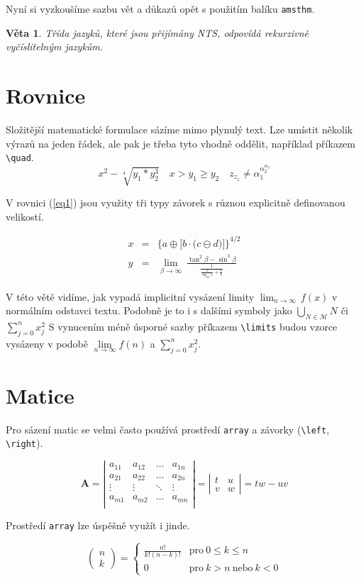 \documentclass[twocolumn,a4paper,11pt,draft]{article}
\newtheorem{theorem}{Věta}
\theoremstyle{definition}
\begin{document}
	Nyní si vyzkoušíme sazbu vět a důkazů opět s použitím balíku \verb!amsthm!.
	
	\begin{theorem}
	Třída jazyků, které jsou přijímány NTS, odpovídá \textnormal{rekurzivně vyčíslitelným jazykům.}
	\end{theorem}
	
	\section{Rovnice}
	Složitější matematické formulace sázíme mimo plynulý text. Lze umístit několik výrazů na jeden řádek, ale pak je třeba tyto vhodně oddělit, například příkazem \verb!\quad!.
	$$x^2-\sqrt[4]{y_1*y_{2}^{3}}\quad x > y_1 \ge y_2\quad z_{z_{z}} \neq \alpha_{1}^{\alpha_{2}^{\alpha_3}}$$
	
	V rovnici (\ref{eq1}) jsou využity tři typy závorek s různou explicitně definovanou velikostí.
	
	\begin{eqnarray}
		\label{eq1}
		x & = &\bigg\{ a \oplus \Big[ b \cdot \big(c \ominus d\big) \Big] \bigg\}^{4/2}\\
		\label{eq2}
		y & = &\underset{\beta \to \infty}{\lim} \ \frac{\tan^2\beta - \sin^3\beta}{\frac{1}{\frac{1}{\log_{42}x}+\frac{1}{2}}}
	\end{eqnarray}
	
	V této větě vidíme, jak vypadá implicitní vysázení limity $\lim_{n \to \infty}\,f(x)$ v normálním odstavci textu. Podobně je to i s dalšími symboly jako $\bigcup_{N \in \mathcal{M}}N$ či $\sum^{n}_{j=0}x^{2}_j$
	S vynucením méně úsporné sazby příkazem \verb!\limits! budou vzorce vysázeny v podobě $\lim\limits_{n\to\infty}f(n)$ a $\sum\limits_{j=0}^{n}x^{2}_j$.
	
	\section{Matice}
	Pro sázení matic se velmi často používá prostředí \verb!array! a závorky (\verb!\left!, \verb!\right!).
	
	$$ \textbf{A} = \left|
	\begin{array}{cccc}
		a_{11} & a_{12} & \ldots & a_{1n}\\
		a_{21} & a_{22} & \ldots & a_{2n}\\
		\vdots & \vdots & \ddots & \vdots\\
		a_{m1} & a_{m2} & \ldots & a_{mn}\\
	\end{array} \right| = 
	\left|
	\begin{array}{cc}
		t & u\\
		v & w
	\end{array} \right| = 	tw - uv
	$$
	
	Prostředí \verb!array! lze úspěšně využít i jinde.
	
	$$
	\left(\!\!\!
	\begin{array}{c}
		n\\k	
	\end{array}\!\!\!
	\right) = 
	\left\{
	\begin{array}{cl}
		\frac{n!}{k!(n-k)!} & \text{pro} \ 0 \leq k \leq n \\
		0 & \text{pro}  \ k > n\  \text{nebo}\ k < 0	
	\end{array}
	\right.
	$$
	
	
\end{document}
